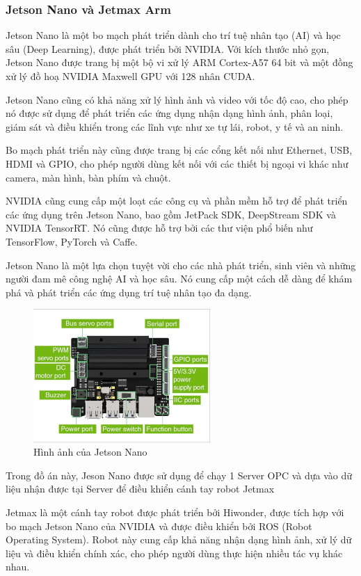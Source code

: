 \subsubsection{Jetson Nano và Jetmax Arm}
Jetson Nano là một bo mạch phát triển dành cho trí tuệ nhân tạo (AI) và học sâu (Deep Learning), được phát triển bởi NVIDIA. Với kích thước nhỏ gọn, Jetson Nano được trang bị một bộ vi xử lý ARM Cortex-A57 64 bit và một đồng xử lý đồ hoạ NVIDIA Maxwell GPU với 128 nhân CUDA.

Jetson Nano cũng có khả năng xử lý hình ảnh và video với tốc độ cao, cho phép nó được sử dụng để phát triển các ứng dụng nhận dạng hình ảnh, phân loại, giám sát và điều khiển trong các lĩnh vực như xe tự lái, robot, y tế và an ninh.

Bo mạch phát triển này cũng được trang bị các cổng kết nối như Ethernet, USB, HDMI và GPIO, cho phép người dùng kết nối với các thiết bị ngoại vi khác như camera, màn hình, bàn phím và chuột.

NVIDIA cũng cung cấp một loạt các công cụ và phần mềm hỗ trợ để phát triển các ứng dụng trên Jetson Nano, bao gồm JetPack SDK, DeepStream SDK và NVIDIA TensorRT. Nó cũng được hỗ trợ bởi các thư viện phổ biến như TensorFlow, PyTorch và Caffe.

Jetson Nano là một lựa chọn tuyệt vời cho các nhà phát triển, sinh viên và những người đam mê công nghệ AI và học sâu. Nó cung cấp một cách dễ dàng để khám phá và phát triển các ứng dụng trí tuệ nhân tạo đa dạng.
\begin{figure}[!h]
    \centering
    \includegraphics[width=0.6\textwidth]{Images/Implementation/Control/JesonNano.jpg}
    \caption{Hình ảnh của Jetson Nano}
\end{figure}

Trong đồ án này, Jeson Nano được sử dụng để chạy 1 Server OPC và dựa vào dữ liệu nhận được tại Server để điều khiển cánh tay robot Jetmax

Jetmax là một cánh tay robot được phát triển bởi Hiwonder, được tích hợp với bo mạch Jetson Nano của NVIDIA và được điều khiển bởi ROS (Robot Operating System). Robot này cung cấp khả năng nhận dạng hình ảnh, xử lý dữ liệu và điều khiển chính xác, cho phép người dùng thực hiện nhiều tác vụ khác nhau.

